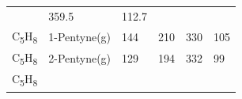 \documentclass[
  9pt,
]{extbook}
\theoremstyle{definition}
\theoremstyle{definition}
\theoremstyle{definition}
\theoremstyle{remark}
\begin{document}
\begin{longtable}[]{@{}llllll@{}}
\begin{minipage}[t]{0.15\columnwidth}
\strut
\end{minipage} & \begin{minipage}[t]{0.14\columnwidth}\raggedright
359.5\strut
\end{minipage} & \begin{minipage}[t]{0.14\columnwidth}\raggedright
112.7\strut
\end{minipage}\tabularnewline
\begin{minipage}[t]{0.07\columnwidth}\raggedright
C\textsubscript{5}H\textsubscript{8}\strut
\end{minipage} & \begin{minipage}[t]{0.17\columnwidth}\raggedright
1-Pentyne(g)\strut
\end{minipage} & \begin{minipage}[t]{0.15\columnwidth}\raggedright
144\strut
\end{minipage} & \begin{minipage}[t]{0.15\columnwidth}\raggedright
210\strut
\end{minipage} & \begin{minipage}[t]{0.14\columnwidth}\raggedright
330\strut
\end{minipage} & \begin{minipage}[t]{0.14\columnwidth}\raggedright
105\strut
\end{minipage}\tabularnewline
\begin{minipage}[t]{0.07\columnwidth}\raggedright
C\textsubscript{5}H\textsubscript{8}\strut
\end{minipage} & \begin{minipage}[t]{0.17\columnwidth}\raggedright
2-Pentyne(g)\strut
\end{minipage} & \begin{minipage}[t]{0.15\columnwidth}\raggedright
129\strut
\end{minipage} & \begin{minipage}[t]{0.15\columnwidth}\raggedright
194\strut
\end{minipage} & \begin{minipage}[t]{0.14\columnwidth}\raggedright
332\strut
\end{minipage} & \begin{minipage}[t]{0.14\columnwidth}\raggedright
99\strut
\end{minipage}\tabularnewline
\begin{minipage}[t]{0.07\columnwidth}\raggedright
C\textsubscript{5}H\textsubscript{8}\strut
\end{minipage} & \begin{minipage}[t]{0.17\columnwidth}\raggedright

\end{minipage}
\end{longtable}
\end{document}
